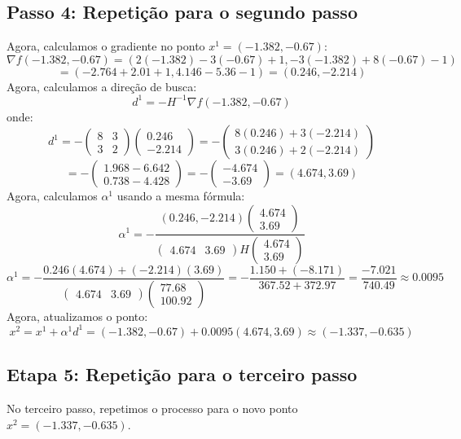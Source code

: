\documentclass[a4paper, 12pt]{article}
\begin{document}
\subsection{Passo 4: Repetição para o segundo passo}
Agora, calculamos o gradiente no ponto \( x^1 = (-1.382, -0.67) \):
\[
\nabla f(-1.382, -0.67) = (2(-1.382) - 3(-0.67) + 1, -3(-1.382) + 8(-0.67) - 1)
\]
\[
= (-2.764 + 2.01 + 1, 4.146 - 5.36 - 1) = (0.246, -2.214)
\]
Agora, calculamos a direção de busca:
\[
d^1 = -H^{-1} \nabla f(-1.382, -0.67)
\]
onde:
\[
d^1 = -\begin{pmatrix} 8 & 3 \\ 3 & 2 \end{pmatrix} \begin{pmatrix} 0.246 \\ -2.214 \end{pmatrix} = -\begin{pmatrix} 8(0.246) + 3(-2.214) \\ 3(0.246) + 2(-2.214) \end{pmatrix}
\]
\[
= -\begin{pmatrix} 1.968 - 6.642 \\ 0.738 - 4.428 \end{pmatrix} = -\begin{pmatrix} -4.674 \\ -3.69 \end{pmatrix} = (4.674, 3.69)
\]
Agora, calculamos \( \alpha^1 \) usando a mesma fórmula:
\[
\alpha^1 = -\frac{(0.246, -2.214) \begin{pmatrix} 4.674 \\ 3.69 \end{pmatrix}}{\begin{pmatrix} 4.674 & 3.69 \end{pmatrix} H \begin{pmatrix} 4.674 \\ 3.69 \end{pmatrix}}
\]
\[
\alpha^1 = -\frac{0.246(4.674) + (-2.214)(3.69)}{\begin{pmatrix} 4.674 & 3.69 \end{pmatrix} \begin{pmatrix} 77.68 \\ 100.92 \end{pmatrix}} = -\frac{1.150 + (-8.171)}{367.52 + 372.97} = \frac{-7.021}{740.49} \approx 0.0095
\]
Agora, atualizamos o ponto:
\[
x^2 = x^1 + \alpha^1 d^1 = (-1.382, -0.67) + 0.0095(4.674, 3.69) \approx (-1.337, -0.635)
\]

\subsection{Etapa 5: Repetição para o terceiro passo}
No terceiro passo, repetimos o processo para o novo ponto \( x^2 = (-1.337, -0.635) \).
\end{document}
